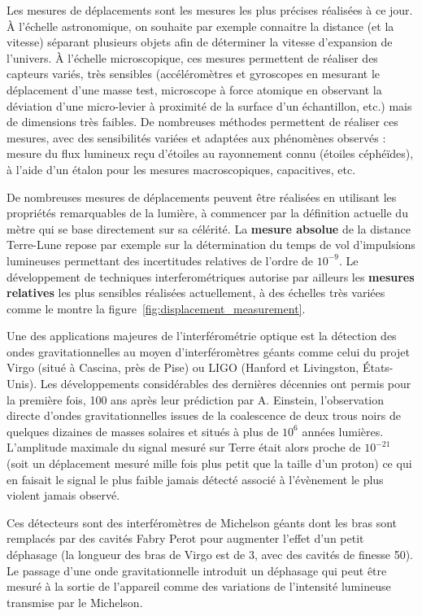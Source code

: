 \documentclass[12pt,a4paper]{article}
\begin{document}
Les mesures de déplacements sont les mesures les plus précises réalisées à ce jour.
À l'échelle astronomique, on souhaite par exemple connaitre la distance (et la vitesse) séparant plusieurs objets afin de déterminer la vitesse d'expansion de l'univers.
À l'échelle microscopique, ces mesures permettent de réaliser des capteurs variés, très sensibles (accéléromètres et gyroscopes en mesurant le déplacement d'une masse test, microscope à force atomique en observant la déviation d'une micro-levier à proximité de la surface d'un échantillon, etc.) mais de dimensions très faibles.
De nombreuses méthodes permettent de réaliser ces mesures, avec des sensibilités variées et adaptées aux phénomènes observés : mesure du flux lumineux reçu d'étoiles au rayonnement connu (étoiles céphéïdes), à l'aide d'un étalon pour les mesures macroscopiques, capacitives, etc.
 
De nombreuses mesures de déplacements peuvent être réalisées en utilisant les propriétés remarquables de la lumière, à commencer par la définition actuelle du mètre qui se base directement sur sa célérité.
La \textbf{mesure absolue} de la distance Terre-Lune repose par exemple sur la détermination du temps de vol d'impulsions lumineuses permettant des incertitudes relatives de l'ordre de $10^{-9}$.
Le développement de techniques interferométriques autorise par ailleurs les \textbf{mesures relatives} les plus sensibles réalisées actuellement, à des échelles très variées comme le montre la figure~\ref{fig:displacement_measurement}.

Une des applications majeures de l'interférométrie optique est la détection des ondes gravitationnelles au moyen d'interféromètres géants comme celui du projet Virgo (situé à Cascina, près de Pise) ou LIGO (Hanford et Livingston, États-Unis).
Les développements considérables des dernières décennies ont permis pour la première fois, 100 ans après leur prédiction par A. Einstein, l'observation directe d'ondes gravitationnelles issues de la coalescence de deux trous noirs de quelques dizaines de masses solaires et situés à plus de $10^6$ années lumières.
L'amplitude maximale du signal mesuré sur Terre était alors proche de $10^{-21}$ (soit un déplacement mesuré mille fois plus petit que la taille d'un proton) ce qui en faisait le signal le plus faible jamais détecté associé à l'évènement le plus violent jamais observé.

Ces détecteurs sont des interféromètres de Michelson géants dont les bras sont remplacés par des cavités Fabry Perot pour augmenter l'effet d'un petit déphasage (la longueur des bras de Virgo est de \unit{3}{\kilo\meter}, avec des cavités de finesse 50).
Le passage d'une onde gravitationnelle introduit un déphasage qui peut être mesuré à la sortie de l'appareil comme des variations de l'intensité lumineuse transmise par le Michelson.
\end{document}
